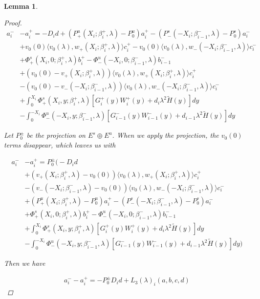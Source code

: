 \documentclass[12pt]{article}
\newtheorem{lemma}{Lemma}
\begin{document}
\begin{lemma}
\begin{proof}
\begin{align*}
a_i^- &- a_i^+ = -D_i d + (P^u_+(X_i; \beta_i^+, \lambda) - P_0^u)a_i^+ - (P^s_-(-X_i; \beta_{i-1}^-, \lambda) - P_0^s)a_i^- \\
&+ v_0(0) \langle v_0(\lambda), w_+(X_i; \beta_i^+, \lambda) \rangle c_i^+ 
- v_0(0) \langle v_0(\lambda), w_-(-X_i; \beta_{i-1}^-, \lambda) \rangle c_i^- \\
&+ \Phi^s_+(X_i, 0; \beta_i^+, \lambda)b_i^+ - \Phi^u_-(-X_i, 0; \beta_{i-1}^-, \lambda)b_{i-1}^- \\
&+ (v_0(0) - v_+(X_i; \beta_i^+, \lambda)) \langle v_0(\lambda), w_+(X_i; \beta_i^+, \lambda) \rangle c_i^+ \\
&- (v_0(0) - v_-(-X_i; \beta_{i-1}^-, \lambda)) \langle v_0(\lambda), w_-(-X_i; \beta_{i-1}^-, \lambda) \rangle c_i^- \\
&+ \int_0^{X_i} \Phi^s_+(X_i, y; \beta_i^+, \lambda) [ G_i^+(y) W_i^+(y) + d_i \lambda^2 \tilde{H}(y) ] dy \\
&- \int_0^{-X_i} \Phi^u_-(-X_i, y; \beta_{i-1}^-, \lambda) [ G_{i-1}^-(y) W_{i-1}^-(y) + d_{i-1} \lambda^2 \tilde{H}(y) ] dy
\end{align*}

Let $P_0^\pm$ be the projection on $E^s \oplus E^u$. When we apply the projection, the $v_0(0)$ terms disappear, which leaves us with

\begin{align*}
a_i^- &- a_i^+ = P_0^\pm \Big(-D_i d \\
&+(v_+(X_i; \beta_i^+, \lambda) - v_0(0)) \langle v_0(\lambda), w_+(X_i; \beta_i^+, \lambda) \rangle c_i^+ \\
&- (v_-(-X_i; \beta_{i-1}^-,\lambda) - v_0(0)) \langle v_0(\lambda), w_-(-X_i; \beta_{i-1}^-, \lambda) \rangle c_i^- \\
&+ (P^u_+(X_i; \beta_i^+, \lambda) - P_0^u)a_i^+ - (P^s_-(-X_i; \beta_{i-1}^-, \lambda) - P_0^s)a_i^- \\
&+ \Phi^s_+(X_i, 0; \beta_i^+, \lambda)b_i^+ - \Phi^u_-(-X_i, 0; \beta_{i-1}^-, \lambda)b_{i-1}^- \\
&+ \int_0^{X_i} \Phi^s_+(X_i, y; \beta_i^+, \lambda) [ G_i^+(y) W_i^+(y) + d_i \lambda^2 \tilde{H}(y) ] dy \\
&- \int_0^{-X_i} \Phi^u_-(-X_i, y; \beta_{i-1}^-, \lambda) [ G_{i-1}^-(y) W_{i-1}^-(y) + d_{i-1} \lambda^2 \tilde{H}(y) ] dy \Big)
\end{align*}

Then we have

\begin{align*}
a_i^- - a_i^+ = -P_0^\pm D_i d + L_3(\lambda)_i(a, b, c, d)
\end{align*}


\end{proof}
\end{lemma}
\end{document}
